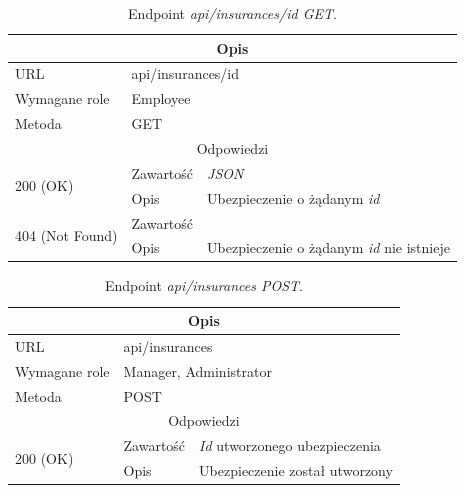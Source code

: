 \documentclass[eng,printmode,openany]{mgr}
\begin{document}
	\begin{table}[H]
		\caption{Endpoint \textit{api/insurances/id GET}.}
		\begin{tabularx}{\textwidth}{|l|l|X|}
			\hline
			\multicolumn{3}{|c|}{Opis}
			\\ \hline
			URL                         & \multicolumn{2}{l|}{api/insurances/id}
			\\ \hline
			Wymagane role               & \multicolumn{2}{l|}{Employee}
			\\ \hline
			Metoda                      & \multicolumn{2}{l|}{GET}
			\\ \hline
			\multicolumn{3}{|c|}{Odpowiedzi}
			\\ \hline
			\multirow{2}{*}{200 (OK)} 	        & Zawartość   	& \textit{JSON}
			\\ \cline{2-3}                      & Opis         	& Ubezpieczenie o żądanym \textit{id}
			\\ \hline
			\multirow{2}{*}{404 (Not Found)} 	& Zawartość     & 
			\\ \cline{2-3}                      & Opis          & Ubezpieczenie o żądanym \textit{id} nie istnieje
			\\ \hline
		\end{tabularx}
	\end{table}
	
	\begin{table}[H]
		\caption{Endpoint \textit{api/insurances POST}.}
		\begin{tabularx}{\textwidth}{|l|l|X|}
			\hline
			\multicolumn{3}{|c|}{Opis}
			\\ \hline
			URL                       & \multicolumn{2}{l|}{api/insurances}
			\\ \hline
			Wymagane role             & \multicolumn{2}{l|}{Manager, Administrator}
			\\ \hline
			Metoda                    & \multicolumn{2}{l|}{POST}
			\\ \hline
			\multicolumn{3}{|c|}{Odpowiedzi}
			\\ \hline
			\multirow{2}{*}{200 (OK)} 		& Zawartość     & \textit{Id} utworzonego ubezpieczenia
			\\ \cline{2-3}                  & Opis         	& Ubezpieczenie został utworzony
			\\ \hline
		\end{tabularx}
	\end{table}
	
\end{document}
